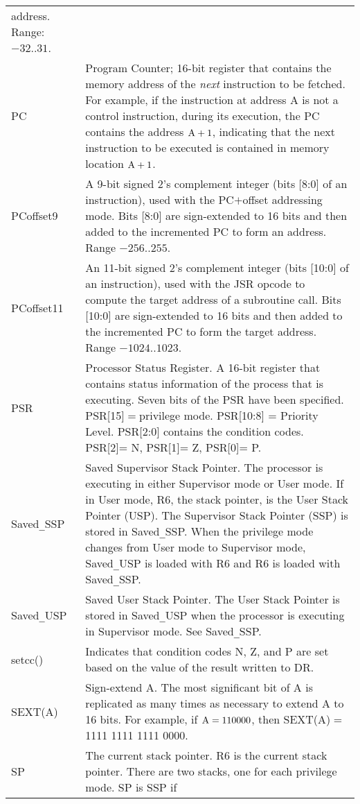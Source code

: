 \documentclass{patt}
\begin{document}
\begin{table}[t]
{\begin{tabular}{@{\hspace{6pt}}lP{24pc}@{}}
 address. Range: $-32..31$. \\
PC & Program Counter; 16-bit register that contains the
 memory address of the {\it next} instruction to be fetched. For example,
 if the instruction at address A is not a control instruction, during 
 its execution, the PC contains the address ${\rm A}+1$, indicating that 
 the next instruction to be executed is contained in memory 
 location ${\rm A}+1$. \\
PCoffset9 &A 9-bit signed 2's complement integer (bits [8:0] of an 
 instruction), used with the
 PC$+$offset addressing mode. Bits [8:0] are sign-extended to 16 bits and then
 added to the incremented PC to form an address. Range $-256..255$. \\
PCoffset11 &An 11-bit signed 2's complement integer (bits [10:0] of an 
instruction), used with the JSR opcode to compute the target address of a 
subroutine call.  Bits [10:0] are sign-extended to 16 bits and then added to 
the incremented PC to form the target address. Range $-1024..1023$.\\
PSR & Processor Status Register. A 16-bit register that contains
status information of the process that is executing. Seven bits 
of the PSR have been specified.  PSR[15]${}={}$privilege mode.
PSR[10:8] = Priority Level.  PSR[2:0] contains the condition codes. 
PSR[2]= N, PSR[1]= Z, PSR[0]= P.\\
Saved\texttt{\_}SSP & Saved Supervisor Stack Pointer.  The processor is 
 executing in either Supervisor mode or User mode.  If in User mode, 
 R6, the stack pointer, is the User Stack Pointer (USP).  The Supervisor
 Stack Pointer (SSP) is stored in Saved\texttt{\_}SSP.  When the privilege mode
 changes from User mode to Supervisor mode, Saved\texttt{\_}USP is loaded 
 with R6 and R6 is loaded with Saved\texttt{\_}SSP.\\
Saved\texttt{\_}USP & Saved User Stack Pointer.  The User Stack Pointer is 
 stored in Saved\texttt{\_}USP when the processor is executing in Supervisor 
 mode.  See Saved\texttt{\_}SSP.\\
setcc() & Indicates that condition codes N, Z, and P are set based
 on the value of the result written to DR.\\
SEXT(A) & Sign-extend A. The most significant bit of A is replicated 
 as many times as necessary to extend A to 16 bits. For example, 
 if ${\rm A}=110000$, then SEXT(A)${}={}$1111 1111 1111 0000.\\
SP & The current stack pointer. R6 is the current stack pointer.
 There are two stacks, one for each privilege mode. SP is SSP if

\end{tabular}}
\end{table}
\end{document}
